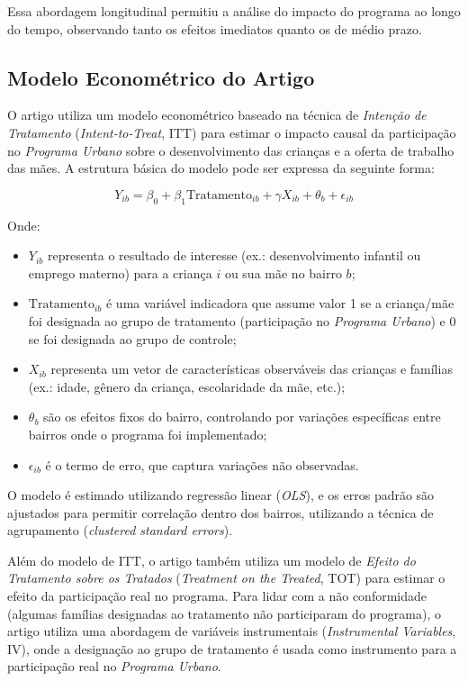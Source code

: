 \documentclass[a4paper,12pt]{article}[abntex2]
\begin{document}
Essa abordagem longitudinal permitiu a análise do impacto do programa ao longo do tempo, observando tanto os efeitos imediatos quanto os de médio prazo.
\subsection{\textbf{Modelo Econométrico do Artigo}}

O artigo utiliza um modelo econométrico baseado na técnica de \textit{Intenção de Tratamento} (\textit{Intent-to-Treat}, ITT) para estimar o impacto causal da participação no \textit{Programa Urbano} sobre o desenvolvimento das crianças e a oferta de trabalho das mães. A estrutura básica do modelo pode ser expressa da seguinte forma:

\begin{equation}
Y_{ib} = \beta_0 + \beta_1 \text{Tratamento}_{ib} + \gamma X_{ib} + \theta_b + \epsilon_{ib}
\end{equation}

Onde:
\begin{itemize}
    \item \( Y_{ib} \) representa o resultado de interesse (ex.: desenvolvimento infantil ou emprego materno) para a criança \( i \) ou sua mãe no bairro \( b \);
    \item \( \text{Tratamento}_{ib} \) é uma variável indicadora que assume valor 1 se a criança/mãe foi designada ao grupo de tratamento (participação no \textit{Programa Urbano}) e 0 se foi designada ao grupo de controle;
    \item \( X_{ib} \) representa um vetor de características observáveis das crianças e famílias (ex.: idade, gênero da criança, escolaridade da mãe, etc.);
    \item \( \theta_b \) são os efeitos fixos do bairro, controlando por variações específicas entre bairros onde o programa foi implementado;
    \item \( \epsilon_{ib} \) é o termo de erro, que captura variações não observadas.
\end{itemize}

O modelo é estimado utilizando regressão linear (\textit{OLS}), e os erros padrão são ajustados para permitir correlação dentro dos bairros, utilizando a técnica de agrupamento (\textit{clustered standard errors}).

Além do modelo de ITT, o artigo também utiliza um modelo de \textit{Efeito do Tratamento sobre os Tratados} (\textit{Treatment on the Treated}, TOT) para estimar o efeito da participação real no programa. Para lidar com a não conformidade (algumas famílias designadas ao tratamento não participaram do programa), o artigo utiliza uma abordagem de variáveis instrumentais (\textit{Instrumental Variables}, IV), onde a designação ao grupo de tratamento é usada como instrumento para a participação real no \textit{Programa Urbano}.
\end{document}
